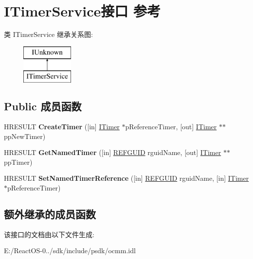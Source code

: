 \hypertarget{interface_i_timer_service}{}\section{I\+Timer\+Service接口 参考}
\label{interface_i_timer_service}
类 I\+Timer\+Service 继承关系图\+:\begin{figure}[H]
\begin{center}
\leavevmode
\includegraphics[height=2.000000cm]{interface_i_timer_service}
\end{center}
\end{figure}
\subsection*{Public 成员函数}
\begin{DoxyCompactItemize}
\item 
\mbox{\label{interface_i_timer_service_a5a3402d4e110ee74ed80059dcbdb7426}} 
H\+R\+E\+S\+U\+LT {\bfseries Create\+Timer} (\mbox{[}in\mbox{]} \hyperlink{interface_i_timer}{I\+Timer} $\ast$p\+Reference\+Timer, \mbox{[}out\mbox{]} \hyperlink{interface_i_timer}{I\+Timer} $\ast$$\ast$pp\+New\+Timer)
\item 
\mbox{\label{interface_i_timer_service_a6352d927a9e9aafdf8cde5a0bf242d24}} 
H\+R\+E\+S\+U\+LT {\bfseries Get\+Named\+Timer} (\mbox{[}in\mbox{]} \hyperlink{struct___g_u_i_d}{R\+E\+F\+G\+U\+ID} rguid\+Name, \mbox{[}out\mbox{]} \hyperlink{interface_i_timer}{I\+Timer} $\ast$$\ast$pp\+Timer)
\item 
\mbox{\label{interface_i_timer_service_a9bc85864f414f61f1e21f0922c646a8c}} 
H\+R\+E\+S\+U\+LT {\bfseries Set\+Named\+Timer\+Reference} (\mbox{[}in\mbox{]} \hyperlink{struct___g_u_i_d}{R\+E\+F\+G\+U\+ID} rguid\+Name, \mbox{[}in\mbox{]} \hyperlink{interface_i_timer}{I\+Timer} $\ast$p\+Reference\+Timer)
\end{DoxyCompactItemize}
\subsection*{额外继承的成员函数}


该接口的文档由以下文件生成\+:\begin{DoxyCompactItemize}
\item 
E\+:/\+React\+O\+S-\/0../sdk/include/psdk/ocmm.\+idl\end{DoxyCompactItemize}
